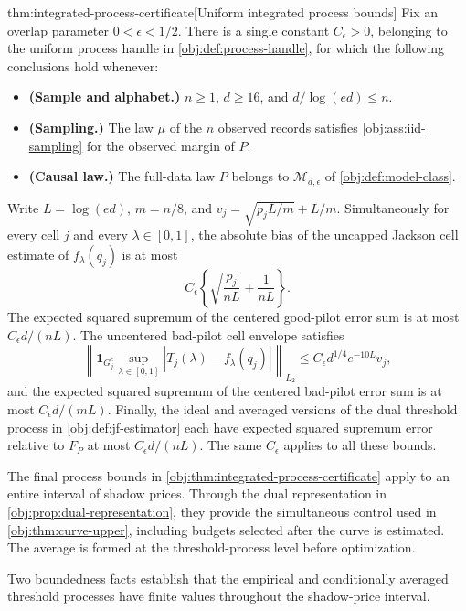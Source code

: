 \begin{theoremv}{thm:integrated-process-certificate}[Uniform integrated process bounds]
Fix an overlap parameter \(0<\epsilon<1/2\). There is a single constant \(C_\epsilon>0\), belonging to the uniform process handle in \cref{obj:def:process-handle}, for which the following conclusions hold whenever:

\begin{itemize}
\item \textbf{(Sample and alphabet.)} \(n\geq1\), \(d\geq16\), and \(d/\log(ed)\leq n\).
\item \textbf{(Sampling.)} The law \(\mu\) of the \(n\) observed records satisfies \cref{obj:ass:iid-sampling} for the observed margin of \(P\).
\item \textbf{(Causal law.)} The full-data law \(P\) belongs to \(\mathcal M_{d,\epsilon}\) of \cref{obj:def:model-class}.
\end{itemize}

Write \(L=\log(ed)\), \(m=n/8\), and \(v_j=\sqrt{p_jL/m}+L/m\). Simultaneously for every cell \(j\) and every \(\lambda\in[0,1]\), the absolute bias of the uncapped Jackson cell estimate of \(f_\lambda(q_j)\) is at most
\[
C_\epsilon\left\{\sqrt{\frac{p_j}{nL}}+\frac{1}{nL}\right\}.
\]
The expected squared supremum of the centered good-pilot error sum is at most \(C_\epsilon d/(nL)\). The uncentered bad-pilot cell envelope satisfies
\[
\left\|\mathbf 1_{G_j^c}\sup_{\lambda\in[0,1]}
\left|T_j(\lambda)-f_\lambda(q_j)\right|\right\|_{L_2}
\leq C_\epsilon d^{1/4}e^{-10L}v_j,
\]
and the expected squared supremum of the centered bad-pilot error sum is at most \(C_\epsilon d/(mL)\). Finally, the ideal and averaged versions of the dual threshold process in \cref{obj:def:jf-estimator} each have expected squared supremum error relative to \(F_P\) at most \(C_\epsilon d/(nL)\). The same \(C_\epsilon\) applies to all these bounds.
\end{theoremv}

The final process bounds in \cref{obj:thm:integrated-process-certificate} apply to an entire interval of shadow prices. Through the dual representation in \cref{obj:prop:dual-representation}, they provide the simultaneous control used in \cref{obj:thm:curve-upper}, including budgets selected after the curve is estimated. The average is formed at the threshold-process level before optimization.

Two boundedness facts establish that the empirical and conditionally averaged threshold processes have finite values throughout the shadow-price interval.

